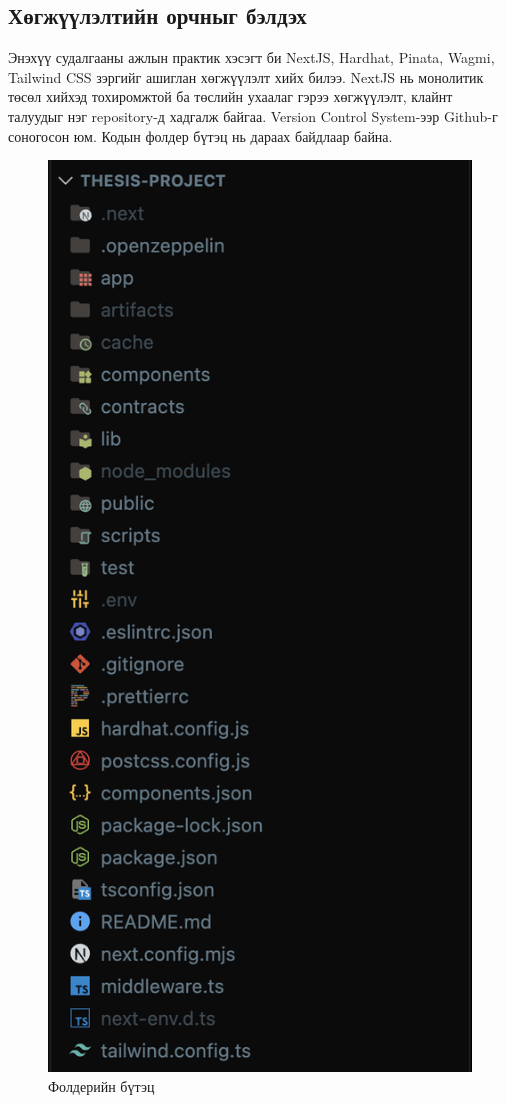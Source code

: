 \subsection{Хөгжүүлэлтийн орчныг бэлдэх}
Энэхүү судалгааны ажлын практик хэсэгт би NextJS, Hardhat, Pinata, Wagmi, Tailwind CSS зэргийг ашиглан хөгжүүлэлт хийх билээ. NextJS нь монолитик төсөл хийхэд тохиромжтой ба төслийн ухаалаг гэрээ хөгжүүлэлт, клайнт талуудыг нэг repository-д хадгалж байгаа. Version Control System-ээр Github-г соногосон юм. Кодын фолдер бүтэц нь дараах байдлаар байна.

\begin{figure}[h]
	\centering
	\includegraphics[scale=0.3]{src/images/folder-structure.png}
	\caption{Фолдерийн бүтэц}
\end{figure}

